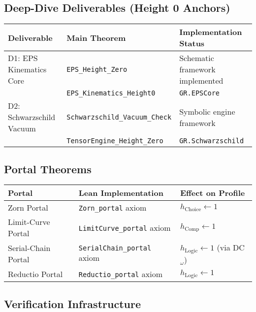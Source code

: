 \documentclass[11pt]{article}
\theoremstyle{definition}
\theoremstyle{remark}
\newcommand{\hChoice}{h_{\mathrm{Choice}}}    %
\newcommand{\hComp}{h_{\mathrm{Comp}}}        %
\newcommand{\hLogic}{h_{\mathrm{Logic}}}      %
\begin{document}
\subsection{Deep-Dive Deliverables (Height 0 Anchors)}

\begin{center}
\small
\begin{tabular}{|p{4cm}|p{5cm}|p{5.5cm}|}
\hline
\textbf{Deliverable} & \textbf{Main Theorem} & \textbf{Implementation Status} \\
\hline
D1: EPS Kinematics Core & \texttt{EPS\_Height\_Zero} & Schematic framework implemented \\
& \texttt{EPS\_Kinematics\_Height0} & \texttt{GR.EPSCore} \\
\hline
D2: Schwarzschild Vacuum & \texttt{Schwarzschild\_Vacuum\_Check} & Symbolic engine framework \\
& \texttt{TensorEngine\_Height\_Zero} & \texttt{GR.Schwarzschild} \\
\hline
\end{tabular}
\end{center}

\subsection{Portal Theorems}

\begin{center}
\small
\begin{tabular}{|p{3.5cm}|p{5cm}|p{6cm}|}
\hline
\textbf{Portal} & \textbf{Lean Implementation} & \textbf{Effect on Profile} \\
\hline
Zorn Portal & \texttt{Zorn\_portal} axiom & $\hChoice \gets 1$ \\
\hline
Limit-Curve Portal & \texttt{LimitCurve\_portal} axiom & $\hComp \gets 1$ \\
\hline
Serial-Chain Portal & \texttt{SerialChain\_portal} axiom & $\hLogic \gets 1$ (via DC$_\omega$) \\
\hline
Reductio Portal & \texttt{Reductio\_portal} axiom & $\hLogic \gets 1$ \\
\hline
\end{tabular}
\end{center}

\subsection{Verification Infrastructure}
\end{document}
